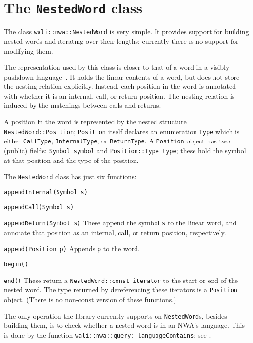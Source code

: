 \section{The \texttt{NestedWord} class}
\label{Se:class-nested-word}

The class \texttt{wali::nwa::NestedWord} is very simple. It provides support for
building nested words and iterating over their lengths; currently there
is no support for modifying them.

The representation used by this class is closer to that of a word in a
visibly-pushdown language~\cite{JACM:AM2009}. It holds the linear contents of
a word, but does not store the nesting relation explicitly. Instead, each
position in the word is annotated with whether it is an internal, call, or
return position. The nesting relation is induced by the matchings between
calls and returns.

A position in the word is represented by the nested structure
\texttt{NestedWord::Position}; \texttt{Position} itself declares an
enumeration \texttt{Type} which is either \texttt{CallType},
\texttt{InternalType}, or \texttt{ReturnType}.
A \texttt{Position} object has two (public) fields: \texttt{Symbol symbol}
and \texttt{Position::Type type}; these hold the symbol at that position and
the type of the position.


The \texttt{NestedWord} class has just six functions:
\begin{description}
  \item\texttt{appendInternal(Symbol s)}
  \item\texttt{appendCall(Symbol s)}
  \item\texttt{appendReturn(Symbol s)}
    These append the symbol \texttt{s} to the linear word, and annotate that
    position as an internal, call, or return position, respectively.
  \item\texttt{append(Position p)}
    Appends \texttt{p} to the word.
  \item\texttt{begin()}
  \item\texttt{end()}
    These return a \texttt{NestedWord::const\_iterator} to the start or end
    of the nested word. The type returned by dereferencing these iterators is
    a \texttt{Position} object. (There is no non-const version of these
    functions.)
\end{description}

The only operation the library currently supports on
\texttt{NestedWord}s, besides building them, is to check whether a
nested word is in an NWA's language. This is done by the function
\texttt{wali::nwa::query::languageContains}; see
.

